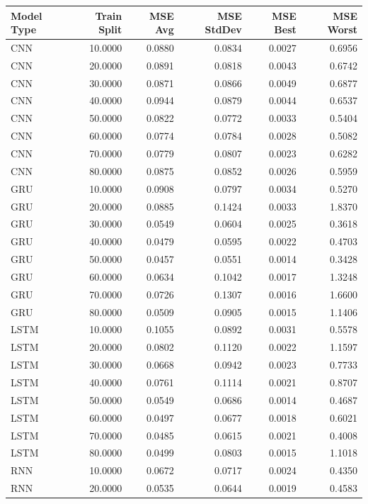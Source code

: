 \begin{tabular}{lrrrrr}
\toprule
Model Type & Train Split & MSE Avg & MSE StdDev & MSE Best & MSE Worst \\
\midrule
CNN & 10.0000 & 0.0880 & 0.0834 & 0.0027 & 0.6956 \\
CNN & 20.0000 & 0.0891 & 0.0818 & 0.0043 & 0.6742 \\
CNN & 30.0000 & 0.0871 & 0.0866 & 0.0049 & 0.6877 \\
CNN & 40.0000 & 0.0944 & 0.0879 & 0.0044 & 0.6537 \\
CNN & 50.0000 & 0.0822 & 0.0772 & 0.0033 & 0.5404 \\
CNN & 60.0000 & 0.0774 & 0.0784 & 0.0028 & 0.5082 \\
CNN & 70.0000 & 0.0779 & 0.0807 & 0.0023 & 0.6282 \\
CNN & 80.0000 & 0.0875 & 0.0852 & 0.0026 & 0.5959 \\
GRU & 10.0000 & 0.0908 & 0.0797 & 0.0034 & 0.5270 \\
GRU & 20.0000 & 0.0885 & 0.1424 & 0.0033 & 1.8370 \\
GRU & 30.0000 & 0.0549 & 0.0604 & 0.0025 & 0.3618 \\
GRU & 40.0000 & 0.0479 & 0.0595 & 0.0022 & 0.4703 \\
GRU & 50.0000 & 0.0457 & 0.0551 & 0.0014 & 0.3428 \\
GRU & 60.0000 & 0.0634 & 0.1042 & 0.0017 & 1.3248 \\
GRU & 70.0000 & 0.0726 & 0.1307 & 0.0016 & 1.6600 \\
GRU & 80.0000 & 0.0509 & 0.0905 & 0.0015 & 1.1406 \\
LSTM & 10.0000 & 0.1055 & 0.0892 & 0.0031 & 0.5578 \\
LSTM & 20.0000 & 0.0802 & 0.1120 & 0.0022 & 1.1597 \\
LSTM & 30.0000 & 0.0668 & 0.0942 & 0.0023 & 0.7733 \\
LSTM & 40.0000 & 0.0761 & 0.1114 & 0.0021 & 0.8707 \\
LSTM & 50.0000 & 0.0549 & 0.0686 & 0.0014 & 0.4687 \\
LSTM & 60.0000 & 0.0497 & 0.0677 & 0.0018 & 0.6021 \\
LSTM & 70.0000 & 0.0485 & 0.0615 & 0.0021 & 0.4008 \\
LSTM & 80.0000 & 0.0499 & 0.0803 & 0.0015 & 1.1018 \\
RNN & 10.0000 & 0.0672 & 0.0717 & 0.0024 & 0.4350 \\
RNN & 20.0000 & 0.0535 & 0.0644 & 0.0019 & 0.4583 \\

\end{tabular}
